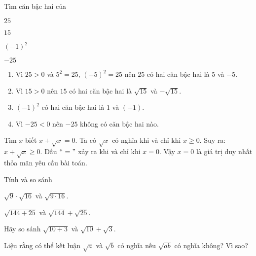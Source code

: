 \begin{vd}
Tìm căn bậc hai của
\begin{listEX}[4] 
	\item $25$
	\item $15$
	\item $(-1)^2$
	\item $-25$
\end{listEX}
\loigiai
{
\begin{enumerate}
	\item Vì $25>0$ và $5^2=25$,  $(-5)^2=25$ nên $25$ có hai căn bậc hai là $5$ và $-5$.
	\item Vì $15>0$ nên $15$ có hai căn bậc hai là $\sqrt{15}$ và $-\sqrt{15}$.
	\item $(-1)^2$ có hai căn bậc hai là $1$ và $(-1)$.
	\item Vì $-25<0$ nên $-25$ không có căn bậc hai nào.
\end{enumerate}
}
\end{vd}
\begin{vd}
Tìm $x$ biết $x+\sqrt{x}=0$.
\loigiai
{
Ta có $\sqrt{x}$ có nghĩa khi và chỉ khi $x\ge 0$. Suy ra: $x+\sqrt{x}\ge 0$. Dấu $``="$ xảy ra khi và chỉ khi $x=0$. Vậy $x=0$ là giá trị duy nhất thỏa mãn yêu cầu bài toán.
}
\end{vd}
\begin{vd}
Tính và so sánh
\begin{listEX}[2]
\item $\sqrt{9}\cdot \sqrt{16}$ và $\sqrt{9\cdot 16}$.
\item $\sqrt{144+25}$ và $\sqrt{144}+\sqrt{25}$.
\end{listEX}
\end{vd}
\begin{vd}
	Hãy so sánh $\sqrt{10+3}$ và $\sqrt{10} + \sqrt{3}$.
\end{vd}
\begin{vd}
Liệu rằng có thể kết luận $\sqrt{a}$ và $\sqrt{b}$ có nghĩa nếu $\sqrt{ab}$ có nghĩa không? Vì sao?
\end{vd}
